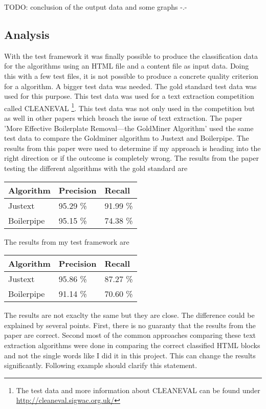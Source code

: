 TODO: conclusion of the output data and some graphs -.-

\subsection{Analysis}

With the test framework it was finally possible to produce the classification data for the  algorithms using an HTML file and a content file as input data. Doing this with a few test files, it is not possible to produce a concrete quality criterion for a algorithm. A bigger test data was needed. The gold standard test data was used for this purpose. This test data was used for a text extraction competition called CLEANEVAL \footnote{The test data and more information about CLEANEVAL can be found under \url{http://cleaneval.sigwac.org.uk/}}. This test data was not only used in the competition but as well in other papers which broach the issue of text extraction. The paper 'More Effective Boilerplate Removal—the GoldMiner Algorithm' used the same test data to compare the Goldminer algorithm to Justext and Boilerpipe. The results from this paper were used to determine if my approach is heading into the right direction or if the outcome is completely wrong. 
The results from the paper testing the different algorithms with the gold standard  are

\begin{tabular}{| p{3cm} | p{3cm} | p{3cm} | }
    \hline
    \textbf{Algorithm}      & \textbf{Precision}  & \textbf{Recall} 				\\ \hline
    Justext     & 95.29 \%       &  91.99 \%		\\ \hline
    Boilerpipe & 95.15 \%       &  74.38 \%		\\ \hline
\end{tabular}

The results from my test framework are

\begin{tabular}{| p{3cm} | p{3cm} | p{3cm} | }
    \hline
    \textbf{Algorithm}      & \textbf{Precision}  & \textbf{Recall} 				\\ \hline
    Justext     & 95.86 \%       &  87.27 \%		\\ \hline
    Boilerpipe & 91.14 \%       &  70.60 \%		\\ \hline
\end{tabular}

The results are not exaclty the same but they are close. The difference could be explained by several points. First, there is no guaranty that the results from the paper are correct. Second most of the common approaches comparing these text extraction algorithms were done in comparing the correct classified HTML blocks and not the single words like I did it in this project. This can change the results significantly. Following example should clarify this statement.

